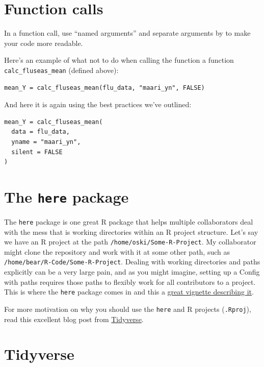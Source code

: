 \documentclass[
]{book}
\begin{document}
\section{Function calls}\label{function-calls}

In a function call, use ``named arguments'' and separate arguments by to make your code more readable.

Here's an example of what not to do when calling the function a function \texttt{calc\_fluseas\_mean} (defined above):

\begin{verbatim}
mean_Y = calc_fluseas_mean(flu_data, "maari_yn", FALSE)
\end{verbatim}

And here it is again using the best practices we've outlined:

\begin{verbatim}
mean_Y = calc_fluseas_mean(
  data = flu_data, 
  yname = "maari_yn",
  silent = FALSE
)
\end{verbatim}

\section{\texorpdfstring{The \texttt{here} package}{The here package}}\label{the-here-package}

The \texttt{here} package is one great R package that helps multiple collaborators deal with the mess that is working directories within an R project structure. Let's say we have an R project at the path \texttt{/home/oski/Some-R-Project}. My collaborator might clone the repository and work with it at some other path, such as \texttt{/home/bear/R-Code/Some-R-Project}. Dealing with working directories and paths explicitly can be a very large pain, and as you might imagine, setting up a Config with paths requires those paths to flexibly work for all contributors to a project. This is where the \texttt{here} package comes in and this a \href{https://github.com/jennybc/here_here}{great vignette describing it}.

For more motivation on why you should use the \texttt{here} and R projects (\texttt{.Rproj}), read this excellent blog post from \href{https://www.tidyverse.org/articles/2017/12/workflow-vs-script/}{Tidyverse}.

\section{Tidyverse}\label{tidyverse}
\end{document}
